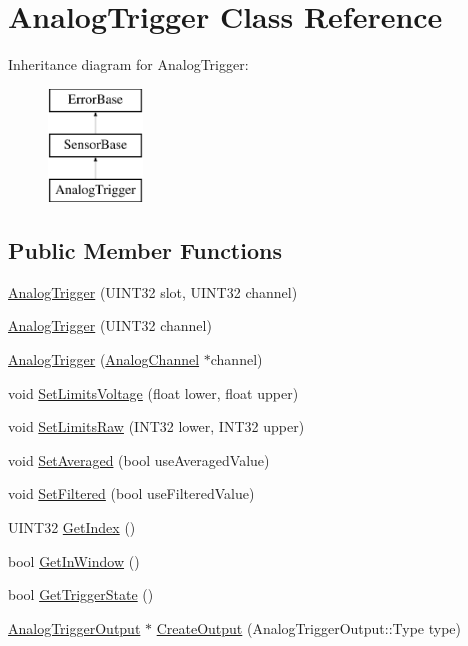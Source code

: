 \hypertarget{classAnalogTrigger}{\section{\-Analog\-Trigger \-Class \-Reference}
\label{classAnalogTrigger}
}
\-Inheritance diagram for \-Analog\-Trigger\-:\begin{figure}[H]
\begin{center}
\leavevmode
\includegraphics[height=3.000000cm]{classAnalogTrigger}
\end{center}
\end{figure}
\subsection*{\-Public \-Member \-Functions}
\begin{DoxyCompactItemize}
\item 
\hyperlink{classAnalogTrigger_a7d370b42d050aec9816a41cd0497d189}{\-Analog\-Trigger} (\-U\-I\-N\-T32 slot, \-U\-I\-N\-T32 channel)
\item 
\hyperlink{classAnalogTrigger_a336d4a7382c5616b1881e7c16f3e2bc0}{\-Analog\-Trigger} (\-U\-I\-N\-T32 channel)
\item 
\hyperlink{classAnalogTrigger_aee536c4e10aefc84394532d7b9b68b49}{\-Analog\-Trigger} (\hyperlink{classAnalogChannel}{\-Analog\-Channel} $\ast$channel)
\item 
void \hyperlink{classAnalogTrigger_a2c93aad3d8086ef2627bad4f642e538d}{\-Set\-Limits\-Voltage} (float lower, float upper)
\item 
void \hyperlink{classAnalogTrigger_a495e6dbbca044e64399e28af60bf5ca1}{\-Set\-Limits\-Raw} (\-I\-N\-T32 lower, \-I\-N\-T32 upper)
\item 
void \hyperlink{classAnalogTrigger_a450ceb7903cc3cc62beb712bdb2365b4}{\-Set\-Averaged} (bool use\-Averaged\-Value)
\item 
void \hyperlink{classAnalogTrigger_a1a362d7f7e82eed22d3d384b7a7792fa}{\-Set\-Filtered} (bool use\-Filtered\-Value)
\item 
\-U\-I\-N\-T32 \hyperlink{classAnalogTrigger_a674516aebe1f7be51110658333957385}{\-Get\-Index} ()
\item 
bool \hyperlink{classAnalogTrigger_a67f35a6ae7f5d4cde09530b9c35a471c}{\-Get\-In\-Window} ()
\item 
bool \hyperlink{classAnalogTrigger_a867ff45d7b9d30ee8b9970175862a3aa}{\-Get\-Trigger\-State} ()
\item 
\hyperlink{classAnalogTriggerOutput}{\-Analog\-Trigger\-Output} $\ast$ \hyperlink{classAnalogTrigger_a9873edc2ccb82375c63f69b4355de52d}{\-Create\-Output} (\-Analog\-Trigger\-Output\-::\-Type type)
\end{DoxyCompactItemize}
